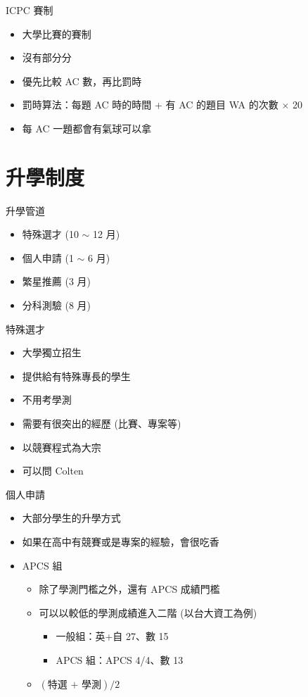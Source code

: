 \documentclass[aspectratio=169]{beamer}
\begin{document}
    \begin{frame}{ICPC 賽制}
    	\begin{itemize}
    		\item<1-> 大學比賽的賽制
    		\item<2-> 沒有部分分
    		\item<3-> 優先比較 AC 數，再比罰時
    		\item<4-> 罰時算法：每題 AC 時的時間 + 有 AC 的題目 WA 的次數 $\times$ 20
    		\item<5-> 每 AC 一題都會有氣球可以拿
    	\end{itemize}
    \end{frame}

	\section{升學制度}

	\begin{frame}{升學管道}
		\begin{itemize}
			\item 特殊選才 (10 $\sim$ 12 月)
			\item 個人申請 (1 $\sim$ 6 月)
			\item 繁星推薦 (3 月)
			\item 分科測驗 (8 月)
		\end{itemize}
	\end{frame}

	\begin{frame}{特殊選才}
		\begin{itemize}
			\item<1-> 大學獨立招生
			\item<2-> 提供給有特殊專長的學生
			\item<3-> 不用考學測
			\item<4-> 需要有很突出的經歷 (比賽、專案等)
			\item<5-> 以競賽程式為大宗
			\item<6-> 可以問 Colten
		\end{itemize}
	\end{frame}

	\begin{frame}{個人申請}
		\begin{itemize}
			\item<1-> 大部分學生的升學方式
			\item<2-> 如果在高中有競賽或是專案的經驗，會很吃香
			\item<3-> APCS 組
			\begin{itemize}
				\item 除了學測門檻之外，還有 APCS 成績門檻
				\item 可以以較低的學測成績進入二階 (以台大資工為例)
					\begin{itemize}
						\item 一般組：英+自 27、數 15
						\item APCS 組：APCS 4/4、數 13
					\end{itemize}
				\item $(\text{特選 + 學測})/2$
			\end{itemize}
		\end{itemize}
	\end{frame}
\end{document}
